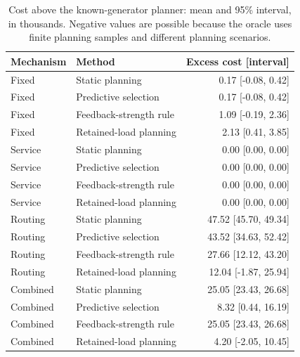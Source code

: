 \begin{table}[p]\caption{Cost above the known-generator planner: mean and 95\% interval, in thousands. Negative values are possible because the oracle uses finite planning samples and different planning scenarios.}\centering\small\setlength{\tabcolsep}{3pt}\begin{tabular}{llr}\toprule
Mechanism & Method & Excess cost [interval]\\\midrule
Fixed & Static planning & 0.17 [-0.08, 0.42]\\
Fixed & Predictive selection & 0.17 [-0.08, 0.42]\\
Fixed & Feedback-strength rule & 1.09 [-0.19, 2.36]\\
Fixed & Retained-load planning & 2.13 [0.41, 3.85]\\
Service & Static planning & 0.00 [0.00, 0.00]\\
Service & Predictive selection & 0.00 [0.00, 0.00]\\
Service & Feedback-strength rule & 0.00 [0.00, 0.00]\\
Service & Retained-load planning & 0.00 [0.00, 0.00]\\
Routing & Static planning & 47.52 [45.70, 49.34]\\
Routing & Predictive selection & 43.52 [34.63, 52.42]\\
Routing & Feedback-strength rule & 27.66 [12.12, 43.20]\\
Routing & Retained-load planning & 12.04 [-1.87, 25.94]\\
Combined & Static planning & 25.05 [23.43, 26.68]\\
Combined & Predictive selection & 8.32 [0.44, 16.19]\\
Combined & Feedback-strength rule & 25.05 [23.43, 26.68]\\
Combined & Retained-load planning & 4.20 [-2.05, 10.45]\\
\bottomrule\end{tabular}\end{table}

